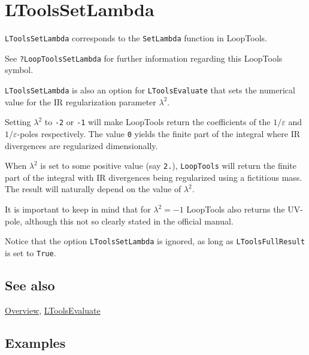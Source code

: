 \documentclass[../FeynHelpersManual.tex]{subfiles}
\begin{document}
\hypertarget{ltoolssetlambda}{
\section{LToolsSetLambda}\label{ltoolssetlambda}}

\texttt{LToolsSetLambda} corresponds to the \texttt{SetLambda} function
in LoopTools.

See \texttt{?LoopTools\textasciigrave SetLambda} for further information
regarding this LoopTools symbol.

\texttt{LToolsSetLambda} is also an option for \texttt{LToolsEvaluate}
that sets the numerical value for the IR regularization parameter
\(\lambda^2\).

Setting \(\lambda^2\) to \texttt{-2} or \texttt{-1} will make LoopTools
return the coefficients of the \(1/\varepsilon\) and
\(1/\varepsilon\)-poles respectively. The value \texttt{0} yields the
finite part of the integral where IR divergences are regularized
dimensionally.

When \(\lambda^2\) is set to some positive value (say \texttt{2.}),
\texttt{LoopTools} will return the finite part of the integral with IR
divergences being regularized using a fictitious mass. The result will
naturally depend on the value of \(\lambda^2\).

It is important to keep in mind that for \(\lambda^2 = -1\) LoopTools
also returns the UV-pole, although this not so clearly stated in the
official manual.

Notice that the option \texttt{LToolsSetLambda} is ignored, as long as
\texttt{LToolsFullResult} is set to \texttt{True}.

\subsection{See also}

\hyperlink{toc}{Overview}, \hyperlink{ltoolsevaluate}{LToolsEvaluate}

\subsection{Examples}
\end{document}

